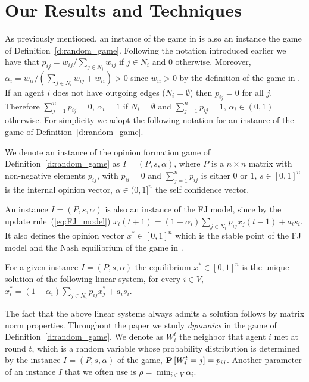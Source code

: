 \section{Our Results and Techniques}\label{s:results}
As previously mentioned, an instance of the game in \cite{BKO11}
is also an instance the game of Definition~\ref{d:random_game}.
Following the notation introduced earlier we have that
$p_{ij} = w_{ij}/\sum_{j \in N_i}w_{ij}$ if $j \in N_i$ and $0$ otherwise.
Moreover, $\alpha_i=w_{ii}/(\sum_{j \in N_i}w_{ij}+w_{ii})>0$ since $w_{ii}>0$
by the definition of the game in \cite{BKO11}. 
If an agent $i$ does not have outgoing edges ($N_i = \emptyset$) then
$p_{ij} = 0$ for all $j$. Therefore $\sum_{j=1}^n p_{ij}=0$, $\alpha_i=1$ if $N_i= \emptyset$
and $\sum_{j=1}^n p_{ij}=1$, $\alpha_i \in (0,1)$ otherwise.
For simplicity we adopt the following notation for
an instance of the game of Definition~\ref{d:random_game}.
%
\begin{definition}\label{d:instance}
  We denote an instance of the opinion formation game of Definition~\ref{d:random_game}
  as $I=(P,s,\alpha)$, where
    $P$ is a $n \times n$  matrix with non-negative elements $p_{ij}$,
      with $p_{ii}=0$ and $\sum_{j=1}^n p_{ij}$ is either $0$ or $1$,
    $s \in [0,1]^n$ is the internal opinion vector,
    $\alpha \in (0,1]^n$ the self confidence vector.
\end{definition}
%

An instance $I=(P,s,\alpha)$ is also an instance
of the FJ model, since by the update rule~(\ref{eq:FJ_model}) 
$x_i(t+1)=(1-\alpha_i)\sum_{j \in N_i}p_{ij}x_j(t-1) + a_i s_i$.  
It also defines the opinion vector $x^* \in [0,1]^n$ which is the
stable point of the FJ model and the Nash equilibrium
of the game in \cite{BKO11}.
\begin{definition}
For a given instance $I=(P,s,\alpha)$ the equilibrium
$x^*\in [0,1]^n$ is the unique solution of the following linear system,
for every $i \in V$, $x^*_i=(1-\alpha_i)\sum_{j \in N_i}p_{ij}x_j^* + a_i s_i$.
\end{definition}
The fact that the above linear systems always admits a solution follows
by matrix norm properties.
Throughout the paper we study \emph{dynamics}
in the game of Definition~\ref{d:random_game}.
We denote as $W_i^t$ the neighbor that agent $i$ met
at round $t$, which is a random variable whose
probability distribution is determined by the
instance $I=(P,s,\alpha)$ of the game, $\bm{\mathrm{P}}\left[W_i^t=j\right]=p_{ij}$.
Another parameter of an instance $I$ that we often use is
$\rho=\min_{i \in V}\alpha_i$.


